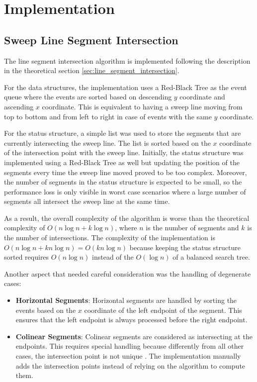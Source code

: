 \section{Implementation}
\subsection{Sweep Line Segment Intersection}
The line segment intersection algorithm is implemented following the description in the theoretical section \ref{sec:line_segment_intersection}.

For the data structures, the implementation uses a Red-Black Tree as the event queue where the events are sorted based on descending $y$ coordinate and ascending $x$ coordinate. This is equivalent to having a sweep line moving from top to bottom and from left to right in case of events with the same $y$ coordinate.

For the status structure, a simple list was used to store the segments that are currently intersecting the sweep line. The list is sorted based on the $x$ coordinate of the intersection point with the sweep line. Initially, the status structure was implemented using a Red-Black Tree as well but updating the position of the segments every time the sweep line moved proved to be too complex. Moreover, the number of segments in the status structure is expected to be small, so the performance loss is only visible in worst case scenarios where a large number of segments all intersect the sweep line at the same time.

As a result, the overall complexity of the algorithm is worse than the theoretical complexity of $O(n\log n + k \log n)$, where $n$ is the number of segments and $k$ is the number of intersections. The complexity of the implementation is $O(n\log n + k n\log n) = O(kn\log n)$ because keeping the status structure sorted requires $O(n\log n)$ instead of the $O(\log n)$ of a balanced search tree.

Another aspect that needed careful consideration was the handling of degenerate cases:
\begin{itemize}
    \item \textbf{Horizontal Segments}:  Horizontal segments are handled by sorting the events based on the $x$ coordinate of the left endpoint of the segment. This ensures that the left endpoint is always processed before the right endpoint.
    \item \textbf{Colinear Segments}: Colinear segments are considered as intersecting at the endpoints. This requires special handling because differently from all other cases, the intersection point is not unique . The implementation manually adds the intersection points instead of relying on the algorithm to compute them.
\end{itemize}


